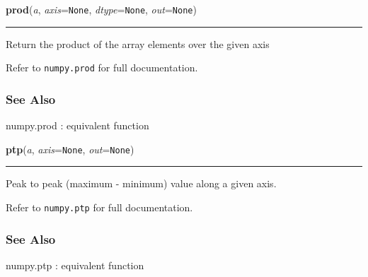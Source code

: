     \begin{boxedminipage}{\textwidth}

    \raggedright \textbf{prod}(\textit{a}, \textit{axis}=\texttt{None}, \textit{dtype}=\texttt{None}, \textit{out}=\texttt{None})

    \vspace{-1.5ex}

    \rule{\textwidth}{0.5\fboxrule}

Return the product of the array elements over the given axis

Refer to \texttt{numpy.prod} for full documentation.



\hypertarget{see-also}{}
\subsubsection*{See Also}

numpy.prod : equivalent function
    \vspace{1ex}

    \end{boxedminipage}

    \label{numpy:ndarray:ptp}

    \vspace{0.5ex}

    \begin{boxedminipage}{\textwidth}

    \raggedright \textbf{ptp}(\textit{a}, \textit{axis}=\texttt{None}, \textit{out}=\texttt{None})

    \vspace{-1.5ex}

    \rule{\textwidth}{0.5\fboxrule}

Peak to peak (maximum - minimum) value along a given axis.

Refer to \texttt{numpy.ptp} for full documentation.



\hypertarget{see-also}{}
\subsubsection*{See Also}

numpy.ptp : equivalent function
    \vspace{1ex}

    \end{boxedminipage}

